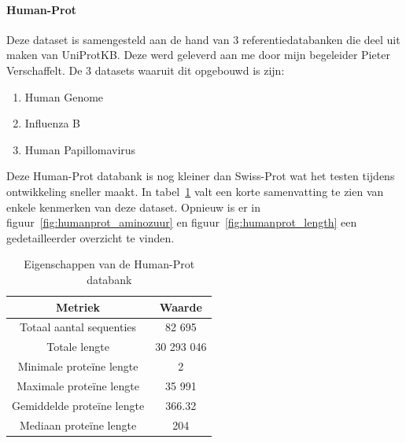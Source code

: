 \documentclass[11pt,dutch,faculty=we,layout=titlefont,underline=false,titleUppercase=true,titleUnderline=true]{ugent2016-report}
\begin{document}
    \paragraph{Human-Prot} Deze dataset is samengesteld aan de hand van 3 referentiedatabanken die deel uit maken van UniProtKB\@.
    Deze werd geleverd aan me door mijn begeleider Pieter Verschaffelt.
    De 3 datasets waaruit dit opgebouwd is zijn:
    \begin{enumerate}
        \item Human Genome~\cite{proteomes_homo_sapiens}
        \item Influenza B~\cite{proteomes_infuenza_b}
        \item Human Papillomavirus~\cite{proteomes_human_papillomavirus}
    \end{enumerate}

    Deze Human-Prot databank is nog kleiner dan Swiss-Prot wat het testen tijdens ontwikkeling sneller maakt.
    In tabel~\ref{tab:humanprot_eigenschappen} valt een korte samenvatting te zien van enkele kenmerken van deze dataset.
    Opnieuw is er in figuur~\ref{fig:humanprot_aminozuur} en figuur~\ref{fig:humanprot_length} een gedetailleerder overzicht te vinden.

    \begin{table}[h!]
        \centering
        \begin{tabular}{ c c }
            Metriek                    & Waarde     \\
            \hline\hline
            Totaal aantal sequenties   & 82 695     \\
            Totale lengte              & 30 293 046 \\
            Minimale proteïne lengte   & 2          \\
            Maximale proteïne lengte   & 35 991     \\
            Gemiddelde proteïne lengte & 366.32     \\
            Mediaan proteïne lengte    & 204        \\
            \hline
        \end{tabular}
        \caption{Eigenschappen van de Human-Prot databank}
        \label{tab:humanprot_eigenschappen}
    \end{table}
\end{document}

